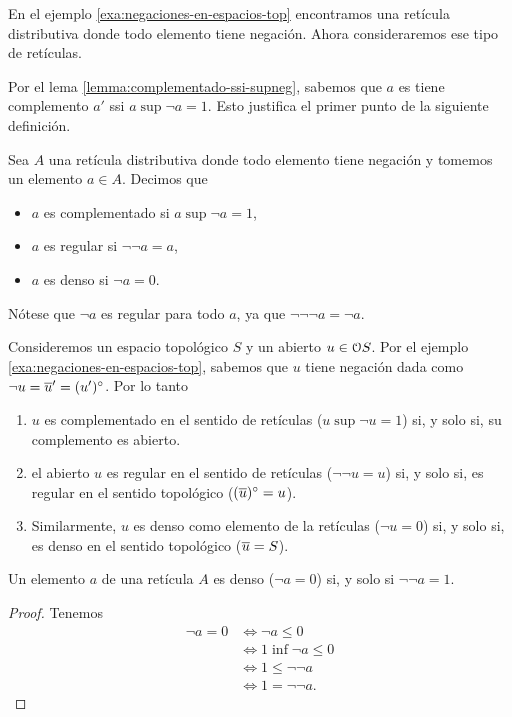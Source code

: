 En el ejemplo \ref{exa:negaciones-en-espacios-top} encontramos
una retícula distributiva donde todo elemento tiene negación.
Ahora consideraremos ese tipo de retículas.

Por el lema \ref{lemma:complementado-ssi-supneg}, sabemos que
$a$ es tiene complemento $a'$ ssi $a\sup\neg a=1$.
Esto justifica el primer punto de la siguiente definición.
\begin{definition}
  Sea $A$ una retícula distributiva donde todo elemento tiene
  negación y tomemos un elemento $a\in A$.
  Decimos que
  \begin{itemize}
    \item $a$ es complementado si $a\sup\neg a=1$,
    \item $a$ es regular si $\neg\neg a = a$,
    \item $a$ es denso si $\neg a = 0$.
  \end{itemize}
\end{definition}

Nótese que $\neg a$ es regular para todo $a$, ya que
$\neg\neg\neg a =\neg a$.

\begin{example}
  Consideremos un espacio topológico $S$ y un abierto $u\in\cal
  OS$. Por el ejemplo \ref{exa:negaciones-en-espacios-top},
  sabemos que $u$ tiene negación dada como $\neg u=\ol
  u'=(u')^\circ$.
  Por lo tanto
  \begin{enumerate}
    \item
    $u$ es complementado en el sentido de retículas
    ($u\sup\neg u=1$)
    si, y solo si, su complemento es abierto.
    \item
    el abierto $u$ es regular en el sentido de retículas
    ($\neg\neg u = u$)
    si, y solo si, es regular en el sentido topológico
    ($(\ol u)^\circ=u$).
    \item
    Similarmente, $u$ es denso como elemento de la retículas
    ($\neg u=0$)
    si, y solo si, es denso en el sentido topológico
    ($\ol u=S$).
  \end{enumerate}
\end{example}

\begin{proposition}%
  Un elemento $a$ de una retícula $A$ es denso
  ($\neg a=0$) si, y solo si $\neg\neg a = 1$.
\end{proposition}
\begin{proof}
Tenemos
\begin{align*}
  \neg a = 0
  &\iff \neg a \leq 0 \\
  &\iff 1\inf \neg a \leq 0 \\
  &\iff 1\leq \neg\neg a \\
  &\iff 1=\neg\neg a.
\end{align*}
\end{proof}

